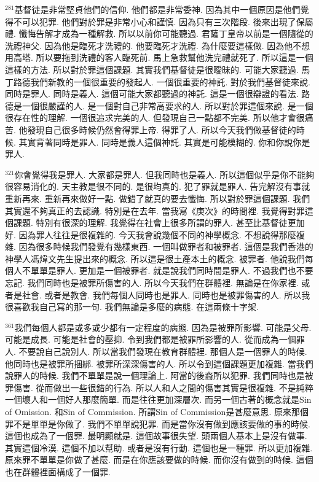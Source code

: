 \documentclass{book}
\begin{document}
$^{281}$基督徒是非常堅貞他們的信仰.
他們都是非常委神.
因為其中一個原因是他們覺得不可以犯罪.
他們對於罪是非常小心和謹慎.
因為只有三次階段.
後來出現了保屬禮.
懺悔告解才成為一種解救.
所以以前你可能聽過.
君薩丁皇帝以前是一個隨從的洗禮神父.
因為他是臨死才洗禮的.
他要臨死才洗禮.
為什麼要這樣做.
因為他不想用高塔.
所以要拖到洗禮的客人臨死前.
馬上急救幫他洗完禮就死了.
所以這是一個這樣的方法.
所以對於罪這個課題.
其實我們基督徒是很曖昧的.
可能大家聽過.
馬丁路德我們新教的一個很重要的發起人.
一個很重要的神託.
對於我們基督徒來說.
同時是罪人.
同時是義人.
這個可能大家都聽過的神託.
這是一個很辯證的看法.
路德是一個很嚴謹的人.
是一個對自己非常高要求的人.
所以對於罪這個來說.
是一個很存在性的理解.
一個很追求完美的人.
但發現自己一點都不完美.
所以他才會很痛苦.
他發現自己很多時候仍然會得罪上帝.
得罪了人.
所以今天我們做基督徒的時候.
其實背著同時是罪人.
同時是義人這個神託.
其實是可能模糊的.
你和你說你是罪人.

$^{321}$你會覺得我是罪人.
大家都是罪人.
但我同時也是義人.
所以這個似乎是你不能夠很容易消化的.
天主教是很不同的.
是很均真的.
犯了罪就是罪人.
告完解沒有事就重新再來.
重新再來做好一點.
做錯了就真的要去懺悔.
所以對於罪這個課題.
我們其實還不夠真正的去認識.
特別是在去年.
當我寫《庚次》的時間裡.
我覺得對罪這個課題.
特別有很深的理解.
我覺得在社會上很多所謂的罪人.
甚至比基督徒更加好.
因為罪人往往是很複雜的.
今天我會說幾個不同的神學概念.
不想說得那麼複雜.
因為很多時候我們發覺有幾樣東西.
一個叫做罪者和被罪者.
這個是我們香港的神學人馮煒文先生提出來的概念.
所以這是很土產本土的概念.
被罪者.
他說我們每個人不單單是罪人.
更加是一個被罪者.
就是說我們同時間是罪人.
不過我們也不要忘記.
我們同時也是被罪所傷害的人.
所以今天我們在群體裡.
無論是在你家裡.
或者是社會.
或者是教會.
我們每個人同時也是罪人.
同時也是被罪傷害的人.
所以我很喜歡我自己寫的那一句.
我們無論是多麼的病態.
在這兩條十字架.

$^{361}$我們每個人都是或多或少都有一定程度的病態.
因為是被罪所影響.
可能是父母.
可能是成長.
可能是社會的壓抑.
令到我們都是被罪所影響的人.
從而成為一個罪人.
不要說自己說別人.
所以當我們發現在教育群體裡.
那個人是一個罪人的時候.
他同時也是被罪所捆綁.
被罪所深深傷害的人.
所以令到這個課題更加複雜.
當我們說罪人的時候.
我們不單單是說一個理論上.
阿當的後裔所以犯罪.
我們同時也是被罪傷害.
從而做出一些很錯的行為.
所以人和人之間的傷害其實是很複雜.
不是純粹一個壞人和一個好人那麼簡單.
而是往往更加深層次.
而另一個古著的概念就是Sin of Omission.
和Sin of Commission.
所謂Sin of Commission是甚麼意思.
原來那個罪不是單單是你做了.
我們不單單說犯罪.
而是當你沒有做到應該要做的事的時候.
這個也成為了一個罪.
最明顯就是.
這個故事很失望.
頭兩個人基本上是沒有做事.
其實這個冷漠.
這個不加以幫助.
或者是沒有行動.
這個也是一種罪.
所以更加複雜.
原來罪不單單是你做了甚麼.
而是在你應該要做的時候.
而你沒有做到的時候.
這個也在群體裡面構成了一個罪.
\end{document}
